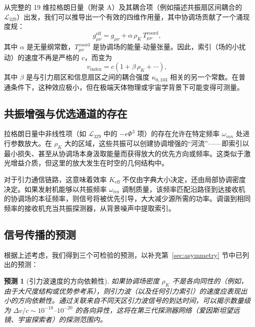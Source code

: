 \documentclass[12pt,a4paper]{article}
\newcommand{\Keff}{K_{\mathrm{eff}}}
\newtheorem{prediction}{预测}
\begin{document}
	从完整的 19 维拉格朗日量（附录 A）及其耦合项（例如描述共振扇区间耦合的 \(\mathcal{L}_{329}\)）出发，我们可以推导出一个有效的四维作用量，其中协调场贡献了一个涌现度规：
	\begin{equation}
		g_{\mu\nu}^{\mathrm{eff}} = g_{\mu\nu} + \alpha \, \rho_K \, T_{\mu\nu}^{\mathrm{coord}},
	\end{equation}
	其中 \(\alpha\) 是无量纲常数，\(T_{\mu\nu}^{\mathrm{coord}}\) 是协调场的能量-动量张量。因此，索引（场的小扰动）的速度不再是严格的 \(c\)，而变为
	\begin{equation}
		v_{\mathrm{index}} = c \left(1 + \beta \, \rho_K + \cdots \right),
	\end{equation}
	其中 \(\beta\) 是与引力扇区和信息扇区之间的耦合强度 \(\kappa_{0,103}\) 相关的另一个常数。在普通条件下，这种效应极小，但在极端天体物理或宇宙学背景下可能变得可测量。
	
	\subsection{共振增强与优选通道的存在}
	
	拉格朗日量中非线性项（如 \(\mathcal{L}_{329}\) 中的 \(-\epsilon \Phi^3\) 项）的存在允许在特定频率 \(\omega_{mn}\) 处进行参数放大。在 \(\rho_K\) 大的区域，这些共振可以创建协调增强的“河流”——即索引以最小损失、甚至从协调场本身汲取能量而获得放大的优先方向或频率。这类似于激光增益介质，但这里的放大发生在时空的几何结构中。
	
	对于引力通信链路，这意味着效率 \(\Keff\) 不仅由字典大小决定，还由局部协调密度决定。如果发射机能够以共振频率 \(\omega_{\mathrm{res}}\) 调制质量，该频率匹配沿路径到达接收机的协调场的本征频率，则信号将被优先引导，大大减少源所需的功率。调谐到相同频率的接收机充当共振探测器，从背景噪声中提取索引。
	
	\subsection{信号传播的预测}
	
	根据上述考虑，我们得到三个可检验的预测，以补充第~\ref{sec:asymmetry} 节中已列出的预测：
	
	\begin{prediction}[引力波速度的方向依赖性]
		如果协调场密度 \(\rho_K\) 不是各向同性的（例如，由于大尺度结构或优势参考系），则引力波（以及任何引力索引）的速度应表现出小的方向依赖性。通过关联来自不同天区引力波信号的到达时间，可以揭示数量级为 \(\Delta v/c \sim 10^{-18}\)–\(10^{-20}\) 的各向异性，这将在第三代探测器网络（爱因斯坦望远镜、宇宙探索者）的探测范围内。
	\end{prediction}
	
\end{document}
